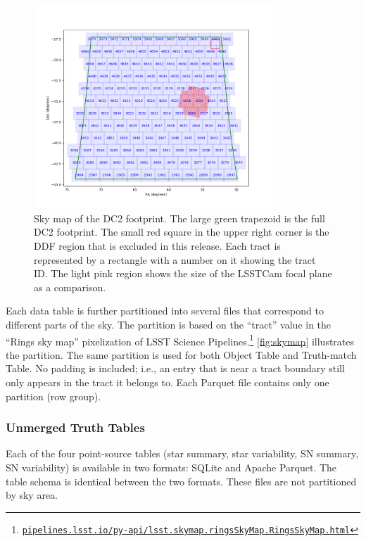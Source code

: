\documentclass[modern]{descnote}
\newcommand*{\https}[1]{\href{https://#1}{\nolinkurl{#1}}}
\begin{document}
\begin{figure}[tbh!]
    \centering
    \includegraphics[width=0.8\textwidth]{figs/DC2_region_skymap_overlay.png}
    \caption{Sky map of the DC2 footprint. The large green trapezoid is the full DC2 footprint. The small red square in the upper right corner is the DDF region that is excluded in this release. Each tract is represented by a rectangle with a number on it showing the tract ID. The light pink region shows the size of the LSSTCam focal plane as a comparison.}
    \label{fig:skymap}
\end{figure}

Each data table is further partitioned into several files that correspond to different parts of the sky. The partition is based on the ``tract'' value in the ``Rings sky map'' pixelization of LSST Science Pipelines.\footnote{\https{pipelines.lsst.io/py-api/lsst.skymap.ringsSkyMap.RingsSkyMap.html}} \autoref{fig:skymap} illustrates the partition. The same partition is used for both Object Table and Truth-match Table. No padding is included; i.e., an entry that is near a tract boundary still only appears in the tract it belongs to. Each Parquet file contains only one partition (row group). 


\subsubsection{Unmerged Truth Tables}
\label{sec:representation-unmerged}

Each of the four point-source tables (star summary, star variability, SN summary, SN variability) is available in two formats: SQLite and Apache Parquet.  The table schema is identical between the two formats.  These files are not partitioned by sky area. 
\end{document}
